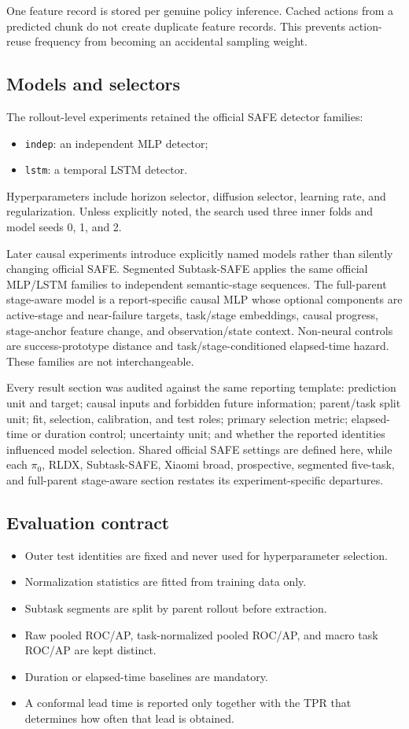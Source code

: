 \documentclass[11pt,a4paper]{article}
\newcommand{\code}[1]{\texttt{#1}}
\begin{document}
One feature record is stored per genuine policy inference. Cached actions from a predicted chunk do not create duplicate feature records. This prevents action-reuse frequency from becoming an accidental sampling weight.

\subsection{Models and selectors}
The rollout-level experiments retained the official SAFE detector families:
\begin{itemize}
\item \code{indep}: an independent MLP detector;
\item \code{lstm}: a temporal LSTM detector.
\end{itemize}
Hyperparameters include horizon selector, diffusion selector, learning rate, and regularization. Unless explicitly noted, the search used three inner folds and model seeds 0, 1, and 2.

Later causal experiments introduce explicitly named models rather than
silently changing official SAFE. Segmented Subtask-SAFE applies the same
official MLP/LSTM families to independent semantic-stage sequences. The
full-parent stage-aware model is a report-specific causal MLP whose optional
components are active-stage and near-failure targets, task/stage embeddings,
causal progress, stage-anchor feature change, and observation/state context.
Non-neural controls are success-prototype distance and task/stage-conditioned
elapsed-time hazard. These families are not interchangeable.

Every result section was audited against the same reporting template:
prediction unit and target; causal inputs and forbidden future information;
parent/task split unit; fit, selection, calibration, and test roles; primary
selection metric; elapsed-time or duration control; uncertainty unit; and
whether the reported identities influenced model selection. Shared official
SAFE settings are defined here, while each $\pi_0$, RLDX, Subtask-SAFE, Xiaomi
broad, prospective, segmented five-task, and full-parent stage-aware section
restates its experiment-specific departures.

\subsection{Evaluation contract}
\begin{itemize}
\item Outer test identities are fixed and never used for hyperparameter selection.
\item Normalization statistics are fitted from training data only.
\item Subtask segments are split by parent rollout before extraction.
\item Raw pooled ROC/AP, task-normalized pooled ROC/AP, and macro task ROC/AP are kept distinct.
\item Duration or elapsed-time baselines are mandatory.
\item A conformal lead time is reported only together with the TPR that determines how often that lead is obtained.
\end{itemize}
\end{document}
